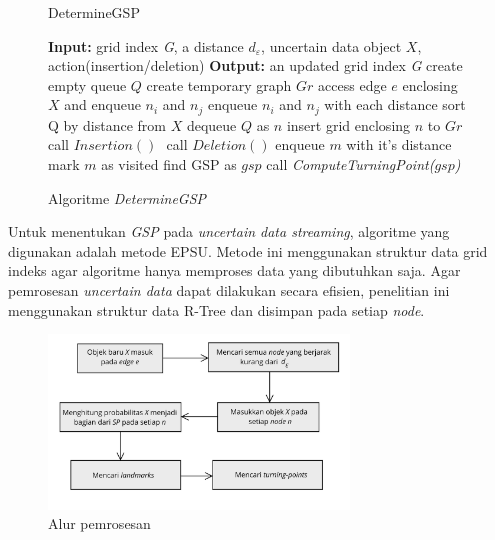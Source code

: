 \documentclass[conference]{IEEEtran}
\begin{document}
\begin{figure}[H]
	\begin{algorithm}[H]
		\label{algo:gsp}
		\caption{DetermineGSP}
		\begin{algorithmic}[1]
			\State \textbf{Input: }grid index \textit{G}, a distance $ d_\varepsilon $, uncertain data object $ X $, action(insertion/deletion)
			\State \textbf{Output: }an updated grid index \textit{G}
			\State create empty queue $ Q $
			\State create temporary graph $ Gr $
			\State access edge $ e $ enclosing $ X $ and enqueue $ n_i  $ and $ n_j $
			\State enqueue $ n_i $ and $ n_j $ with each distance
			\State sort Q by distance from $ X $
			\State dequeue $ Q $ as $ n $
			\State insert grid enclosing $ n $ to $ Gr $
			call $ Insertion() $
			\Else
			$ $ call $ Deletion() $
			\EndIf
			\State enqueue $ m $ with it's distance
			\State mark $ m $ as visited
			\EndIf
			\EndFor
			\EndIf
			\EndWhile
			\State find GSP as $ gsp $
			\State call \textit{ComputeTurningPoint($ gsp $)}
			\EndFor
		\end{algorithmic}
	\end{algorithm}
	\caption{Algoritme \textit{DetermineGSP}}
\end{figure}

Untuk menentukan \textit{GSP} pada \textit{uncertain data streaming}, algoritme yang digunakan adalah metode EPSU\cite{effectiveprob}. Metode ini menggunakan struktur data grid indeks agar algoritme hanya memproses data yang dibutuhkan saja. Agar pemrosesan \textit{uncertain data} dapat dilakukan secara efisien, penelitian ini menggunakan struktur data R-Tree dan disimpan pada setiap \textit{node}.

\begin{figure}[H]
	\centering
	\includegraphics[width=8cm]{imgs/alur.png}
	\caption{Alur pemrosesan}
	\label{fig:alur}
\end{figure}
\end{document}
